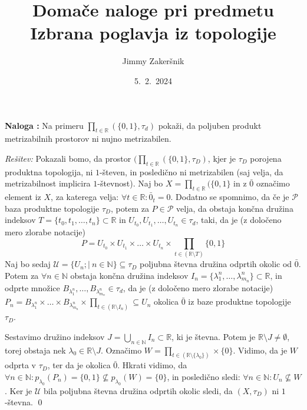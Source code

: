 \documentclass[a4paper, 10pt]{article}
\title{Domače naloge pri predmetu Izbrana poglavja iz topologije}
\date{5.~2.~2024}
\author{Jimmy Zakeršnik}
\newcounter{nalogacount}
\newenvironment{naloga}{\begin{flushleft}\stepcounter{nalogacount}\textbf{Naloga \arabic{nalogacount}:}}{\hfill\end{flushleft}}
\newenvironment{Rešitev}{\begin{flushleft}\textit{Rešitev:}}{\hfill\qed\end{flushleft}}
\newcommand{\mth}[1]{\ensuremath{\mathbb{#1}}}
\newcommand{\R}{\mth{R}}
\newcommand{\N}{\mth{N}}
\begin{document}
	\maketitle
	\thispagestyle{empty}
	\newpage
	\begin{naloga}
		Na primeru $\prod_{t\in\R}(\{0, 1\}, \tau_d)$ pokaži, da poljuben produkt metrizabilnih prostorov ni nujno metrizabilen.
	\end{naloga}
	\begin{Rešitev}
		Pokazali bomo, da prostor $(\prod_{t\in\R}(\{0, 1\}, \tau_D)$, kjer je $\tau_D$ porojena produktna topologija, ni $1$-števen, in posledično ni metrizabilen (saj velja, da metrizabilnost implicira $1$-števnost). Naj bo $X = \prod_{t\in\R}(\{0, 1\}$ in z $\bar{0}$ označimo element iz $X$, za katerega velja: $\forall t \in \R: \bar{0}_t = 0$. Dodatno se spomnimo, da če je $\mathcal{P}$ baza produktne topologije $\tau_D$, potem za $P\in \mathcal{P}$ velja, da obstaja končna družina indeksov $T = \{t_0, t_1, \ldots, t_n\} \subset \R$ in $U_{t_0}, U_{t_1}, \ldots, U_{t_n} \in \tau_d$, taki, da je (z določeno mero zlorabe notacije) $$P = U_{t_0}\times U_{t_1}\times \ldots \times U_{t_n}\times \prod_{t\in(\R\setminus T)}\{0, 1\}$$
		Naj bo sedaj $\mathcal{U} = \{U_n;|~n\in \N\} \subseteq \tau_D$ poljubna števna družina odprtih okolic od $\bar{0}$. Potem za $\forall n\in\N$ obstaja končna družina indeksov $I_n = \{\lambda_1^n, \ldots, \lambda_{m_n}^n\}\subset \R$, in odprte množice $B_{\lambda_1^n}, \ldots, B_{\lambda_{m_n}^n}\in \tau_d$, da je (z določeno mero zlorabe notacije) $P_n = B_{\lambda_1^n}\times \ldots \times B_{\lambda_{m_n}^n} \times \prod_{t\in(\R\setminus I_n)} \subseteq U_n$ okolica $\bar{0}$ iz baze produktne topologije $\tau_D$.
		
		Sestavimo družino indeksov $J = \bigcup_{n\in \N}I_n \subset \R$, ki je števna. Potem je $\R\setminus J \neq \emptyset$, torej obstaja nek $\lambda_0 \in \R\setminus J$. Označimo $W = \prod_{t\in(\R\setminus \{\lambda_0\})} \times \{0\}$. Vidimo, da je $W$ odprta v $\tau_D$, ter da je okolica $\bar{0}$. Hkrati vidimo, da $\forall n\in \N: p_{\lambda_0}(P_n) = \{0, 1\} \nsubseteq p_{\lambda_0}(W) = \{0\}$, in posledično sledi: $\forall n\in \N: U_n \nsubseteq W$. Ker je $\mathcal{U}$ bila poljubna števna družina odprtih okolic sledi, da $(X, \tau_D)$ ni $1$-števna.
	\end{Rešitev}
	
\end{document}

